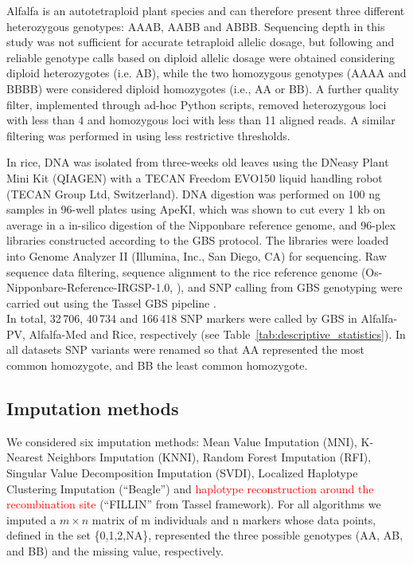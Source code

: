 Alfalfa is an autotetraploid plant species and can therefore present three different heterozygous genotypes: AAAB, AABB and ABBB. Sequencing depth in this study was not sufficient for accurate tetraploid allelic dosage, but following \cite{li_saturated_2014} and \cite{li_genomic_2015} reliable genotype calls based on diploid allelic dosage were obtained considering diploid heterozygotes (i.e. AB), while the two homozygous genotypes (AAAA and BBBB) were considered diploid homozygotes (i.e., AA or BB). A further quality filter, implemented through ad-hoc Python scripts, removed heterozygous loci with less than 4 and homozygous loci with less than 11 aligned reads. A similar filtering was performed in \cite{Rocher_validation_2015} using less restrictive thresholds. 

In rice, DNA was isolated from three-weeks old leaves using the DNeasy Plant Mini Kit (QIAGEN) with a TECAN Freedom EVO150 liquid handling robot (TECAN Group Ltd, Switzerland). DNA digestion was performed on 100 ng samples in 96-well plates using ApeKI, which was shown to cut every 1 kb on average in a in-silico digestion of the Nipponbare reference genome, and 96-plex libraries constructed according to the GBS protocol. The libraries were loaded into Genome Analyzer II (Illumina, Inc., San Diego, CA) for sequencing. Raw sequence data filtering, sequence alignment to the rice reference genome (Os-Nipponbare-Reference-IRGSP-1.0, \cite{kawahara_improvement_2013}), and SNP calling from GBS genotyping were carried out using the Tassel GBS pipeline \cite{glaubitz_tassel-gbs:_2014}.\\
In total, 32\,706, 40\,734 and 166\,418 SNP markers were called by GBS in Alfalfa-PV, Alfalfa-Med and Rice, respectively (see Table~\ref{tab:descriptive_statistics}). In all datasets SNP variants were renamed so that AA represented the most common homozygote, and BB the least common homozygote.



\subsection{Imputation methods}
\label{sec:imputation_methods}
We considered six imputation methods: Mean Value Imputation (MNI), K-Nearest Neighbors Imputation (KNNI), Random Forest Imputation (RFI), Singular Value Decomposition Imputation (SVDI), Localized Haplotype Clustering Imputation (``Beagle'') and \textcolor{red}{haplotype reconstruction around the recombination site}
(``FILLIN'' from Tassel framework). For all algorithms we imputed a $m\times n$ matrix of m individuals and n markers whose data points, defined in the set \{0,1,2,NA\}, represented the three possible genotypes (AA, AB, and BB) and the missing value, respectively. 
